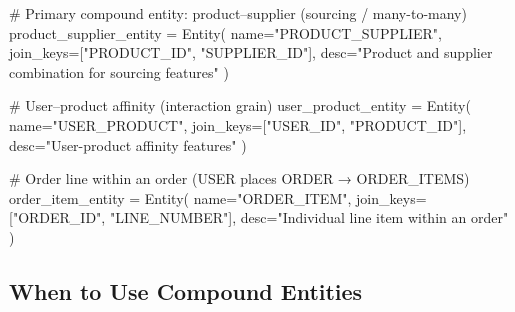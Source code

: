 \documentclass[
  letterpaper,
  DIV=11,
  numbers=noendperiod]{scrreprt}
\newenvironment{Shaded}{\begin{snugshade}}{\end{snugshade}}
\newcommand{\CommentTok}[1]{\textcolor[rgb]{0.37,0.37,0.37}{#1}}
\newcommand{\NormalTok}[1]{\textcolor[rgb]{0.00,0.23,0.31}{#1}}
\newcommand{\OperatorTok}[1]{\textcolor[rgb]{0.37,0.37,0.37}{#1}}
\newcommand{\StringTok}[1]{\textcolor[rgb]{0.13,0.47,0.30}{#1}}
\begin{document}
\begin{Shaded}
\begin{Highlighting}[]
\CommentTok{\# Primary compound entity: product–supplier (sourcing / many{-}to{-}many)}
\NormalTok{product\_supplier\_entity }\OperatorTok{=}\NormalTok{ Entity(}
\NormalTok{    name}\OperatorTok{=}\StringTok{"PRODUCT\_SUPPLIER"}\NormalTok{,}
\NormalTok{    join\_keys}\OperatorTok{=}\NormalTok{[}\StringTok{"PRODUCT\_ID"}\NormalTok{, }\StringTok{"SUPPLIER\_ID"}\NormalTok{],}
\NormalTok{    desc}\OperatorTok{=}\StringTok{"Product and supplier combination for sourcing features"}
\NormalTok{)}

\CommentTok{\# User–product affinity (interaction grain)}
\NormalTok{user\_product\_entity }\OperatorTok{=}\NormalTok{ Entity(}
\NormalTok{    name}\OperatorTok{=}\StringTok{"USER\_PRODUCT"}\NormalTok{,}
\NormalTok{    join\_keys}\OperatorTok{=}\NormalTok{[}\StringTok{"USER\_ID"}\NormalTok{, }\StringTok{"PRODUCT\_ID"}\NormalTok{],}
\NormalTok{    desc}\OperatorTok{=}\StringTok{"User{-}product affinity features"}
\NormalTok{)}

\CommentTok{\# Order line within an order (USER places ORDER → ORDER\_ITEMS)}
\NormalTok{order\_item\_entity }\OperatorTok{=}\NormalTok{ Entity(}
\NormalTok{    name}\OperatorTok{=}\StringTok{"ORDER\_ITEM"}\NormalTok{,}
\NormalTok{    join\_keys}\OperatorTok{=}\NormalTok{[}\StringTok{"ORDER\_ID"}\NormalTok{, }\StringTok{"LINE\_NUMBER"}\NormalTok{],}
\NormalTok{    desc}\OperatorTok{=}\StringTok{"Individual line item within an order"}
\NormalTok{)}
\end{Highlighting}
\end{Shaded}

\hypertarget{when-to-use-compound-entities}{%
\subsection{When to Use Compound
Entities}\label{when-to-use-compound-entities}}
\end{document}
